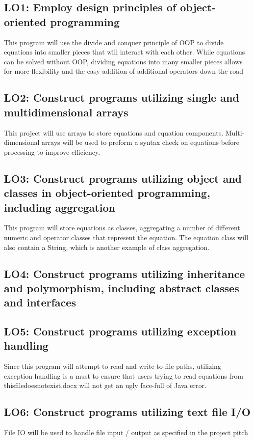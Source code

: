 \documentclass{article}
\begin{document}
\subsection{LO1: Employ design principles of object-oriented programming}
This program will use the divide and conquer principle of OOP to divide equations into smaller pieces that will interact with each other. While equations can be solved without OOP, dividing equations into many smaller pieces allows for more flexibility and the easy addition of additional operators down the road
\subsection{LO2: Construct programs utilizing single and multidimensional arrays}
This project will use arrays to store equations and equation components. Multi-dimensional arrays will be used to preform a syntax check on equations before processing to improve efficiency.
\subsection{LO3: Construct programs utilizing object and classes in object-oriented programming, including aggregation}
This program will store equations as classes, aggregating a number of different numeric and operator classes that represent the equation. The equation class will also contain a String, which is another example of class aggregation.
\subsection{LO4: Construct programs utilizing inheritance and polymorphism, including abstract classes and interfaces}

\subsection{LO5: Construct programs utilizing exception handling}
Since this program will attempt to read and write to file paths, utilizing exception handling is a must to ensure that users trying to read equations from thisfiledoesnotexist.docx will not get an ugly face-full of Java error.
\subsection{LO6: Construct programs utilizing text file I/O}
File IO will be used to handle file input / output as specified in the project pitch
\end{document}
